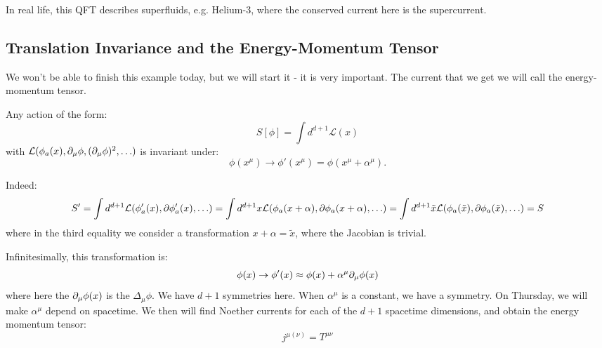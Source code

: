 In real life, this QFT describes superfluids, e.g. Helium-3, where the conserved current here is the supercurrent.

\subsection{Translation Invariance and the Energy-Momentum Tensor}
We won't be able to finish this example today, but we will start it - it is very important. The current that we get we will call the energy-momentum tensor.

Any action of the form:
\begin{equation}
    S[\phi] = \int d^{d+1}\mathcal{L}(x)
\end{equation}
with $\mathcal{L}(\phi_a(x), \partial_\mu \phi, (\partial_\mu \phi)^2, \ldots)$ is invariant under:
\begin{equation}
    \phi(x^\mu) \to \phi'(x^\mu) = \phi(x^\mu + \alpha^\mu).
\end{equation}

Indeed:
\begin{equation}
    S' = \int d^{d+1}\mathcal{L}(\phi_a'(x), \partial\phi_a'(x), \ldots) = \int d^{d+1}x \mathcal{L}(\phi_a(x + \alpha), \partial \phi_a(x + \alpha), \ldots) = \int d^{d+1}\tilde{x} \mathcal{L}(\phi_a(\tilde{x}), \partial \phi_a(\tilde{x}), \ldots) = S
\end{equation}
where in the third equality we consider a transformation $x + \alpha = \tilde{x}$, where the Jacobian is trivial.

Infinitesimally, this transformation is:
\begin{equation}
    \phi(x) \to \phi'(x) \approx \phi(x) + \alpha^\mu \partial_\mu \phi(x)
\end{equation}
where here the $\partial_\mu \phi(x)$ is the $\Delta_\mu \phi$. We have $d+1$ symmetries here. When $\alpha^\mu$ is a constant, we have a symmetry. On Thursday, we will make $\alpha^\mu$ depend on spacetime. We then will find Noether currents for each of the $d+1$ spacetime dimensions, and obtain the energy momentum tensor:
\begin{equation}
    \boxed{j^{\mu(\nu)} = T^{\mu\nu}}
\end{equation}